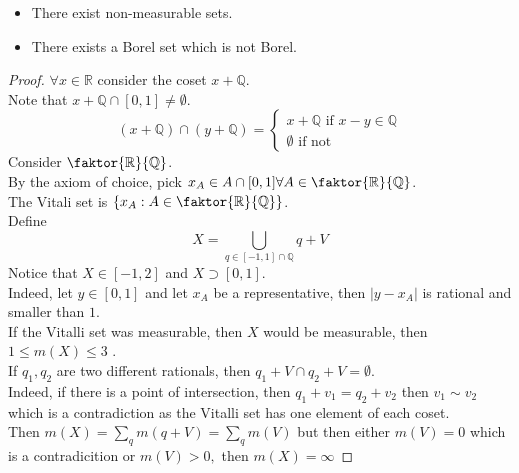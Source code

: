 \documentclass[../main.tex]{subfiles}
\begin{document}
\begin{thm}
	\begin{itemize}
	\item There exist non-measurable sets.
	\item There exists a Borel set which is not Borel.
	\end{itemize}
	
\end{thm}
\begin{proof}
$\forall x \in \mathbb{R}$ consider the coset $x+\mathbb{Q}$.\\
Note that $x+ \mathbb{Q} \cap [ 0,1] \neq \emptyset$.\\
\[ 
	( x+ \mathbb{Q}) \cap ( y+ \mathbb{Q}) = 
	\begin{cases}
	x+ \mathbb{Q} \text{ if } x-y \in \mathbb{Q}\\
	\emptyset \text{ if not } 
	\end{cases}
\]
Consider $ \faktor { \mathbb{R} } { \mathbb{Q}} $.\\
By the axiom of choice, pick $x_A \in A\cap [ 0,1] \forall A \in \faktor { \mathbb{R}} { \mathbb{Q}} $.\\
The Vitali set is $ \left\{ x_A: A \in \faktor { \mathbb{R}} { \mathbb{Q}}  \right\} $.\\
Define
\[ 
X= \bigcup_{ q\in [ -1,1] \cap \mathbb{Q}} q+ V
\]
Notice that $X \in [ -1,2] $ and $X \supset [ 0,1] $.\\
Indeed, let $y \in [ 0,1] $ and let $x_A$ be a representative, then $|y-x_A|$ is rational and smaller than $1$.\\
If the Vitalli set was measurable, then $X$ would be measurable, then
$ 1 \leq m( X) \leq 3$ .\\
If $q_1,q_2$ are two different rationals, then $q_1+V \cap q_2+V = \emptyset$.\\
Indeed, if there is a point of intersection, then $q_1+v_1 = q_2 +v_2$ then $v_1 \sim v_2$ which is a contradiction as the Vitalli set has one element of each coset.\\
Then $m( X) = \sum_q m( q+V) = \sum_q m( V) $ but then either $m( V) = 0 $ which is a contradicition or $m( V) >0,$ then $ m( X) = \infty $ 


\end{proof}

			
\end{document}
